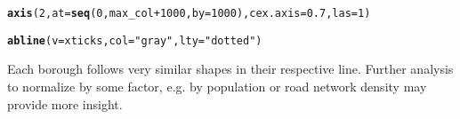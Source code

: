 \documentclass[10pt]{article}\usepackage[]{graphicx}\usepackage[]{xcolor}
\makeatletter
\newcommand{\hlnum}[1]{\textcolor[rgb]{0.686,0.059,0.569}{#1}}%
\newcommand{\hlsng}[1]{\textcolor[rgb]{0.192,0.494,0.8}{#1}}%
\newcommand{\hlopt}[1]{\textcolor[rgb]{0,0,0}{#1}}%
\newcommand{\hldef}[1]{\textcolor[rgb]{0.345,0.345,0.345}{#1}}%
\newcommand{\hlkwc}[1]{\textcolor[rgb]{0.333,0.667,0.333}{#1}}%
\newcommand{\hlkwd}[1]{\textcolor[rgb]{0.737,0.353,0.396}{\textbf{#1}}}%
\newenvironment{kframe}{%
 \def\at@end@of@kframe{}%
 \ifinner\ifhmode%
  \def\at@end@of@kframe{\end{minipage}}%
  \begin{minipage}{\columnwidth}%
 \fi\fi%
 \def\FrameCommand##1{\hskip\@totalleftmargin \hskip-\fboxsep
 \colorbox{shadecolor}{##1}\hskip-\fboxsep
     \hskip-\linewidth \hskip-\@totalleftmargin \hskip\columnwidth}%
 \MakeFramed {\advance\hsize-\width
   \@totalleftmargin\z@ \linewidth\hsize
   \@setminipage}}%
 {\par\unskip\endMakeFramed%
 \at@end@of@kframe}
\newenvironment{knitrout}{}{} %
\makeatother
\begin{document}
\begin{knitrout}
\begin{kframe}
{\ttfamily\noindent\bfseries\color{errorcolor}{\#\# Error: object 'xticks' not found}}\begin{alltt}
\hlkwd{axis}\hldef{(}\hlnum{2}\hldef{,} \hlkwc{at} \hldef{=} \hlkwd{seq}\hldef{(}\hlnum{0}\hldef{, max_col}\hlopt{+}\hlnum{1000}\hldef{,} \hlkwc{by} \hldef{=} \hlnum{1000}\hldef{),} \hlkwc{cex.axis} \hldef{=} \hlnum{0.7}\hldef{,} \hlkwc{las}\hldef{=}\hlnum{1}\hldef{)}
\end{alltt}


{\ttfamily\noindent\bfseries\color{errorcolor}{\#\# Error: object 'max\_col' not found}}\begin{alltt}
\hlkwd{abline}\hldef{(}\hlkwc{v} \hldef{= xticks,} \hlkwc{col} \hldef{=} \hlsng{"gray"}\hldef{,} \hlkwc{lty} \hldef{=} \hlsng{"dotted"}\hldef{)}
\end{alltt}


{\ttfamily\noindent\bfseries\color{errorcolor}{\#\# Error: object 'xticks' not found}}\end{kframe}
\end{knitrout}
Each borough follows very similar shapes in their respective line. Further analysis to normalize by some factor, e.g. by population or road network density may provide more insight.
\end{document}
